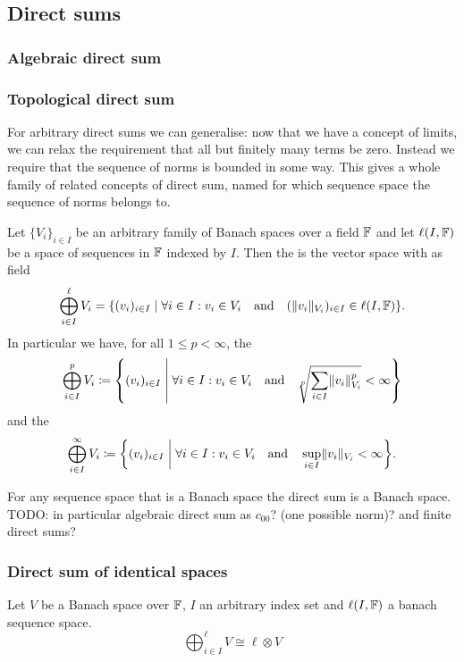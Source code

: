 \subsection{Direct sums}
\subsubsection{Algebraic direct sum}

\subsubsection{Topological direct sum}
For arbitrary direct sums we can generalise: now that we have a concept of limits, we can relax the requirement that all but finitely many terms be zero. Instead we require that the sequence of norms is bounded in some way. This gives a whole family of related concepts of direct sum, named for which sequence space the sequence of norms belongs to.
\begin{definition}
Let $\{V_i\}_{i\in I}$ be an arbitrary family of Banach spaces over a field $\mathbb{F}$ and let $\ell(I,\mathbb{F})$ be a space of sequences in $\mathbb{F}$ indexed by $I$. Then the  is the vector space with as field
\[ \bigoplus_{i\in I}^\ell V_i = \setbuilder{(v_i)_{i\in I}}{\forall i\in I: v_i\in V_i \quad\text{and}\quad (\norm{v_i}_{V_i})_{i\in I}\in \ell(I,\F) }. \]
In particular we have, for all $1\leq p<\infty$, the 
\[ \bigoplus_{i\in I}^p V_i \defeq \setbuilder{(v_i)_{i\in I}}{\forall i\in I: v_i\in V_i \quad\text{and}\quad \sqrt[p]{\sum_{i\in I}\norm{v_i}_{V_i}^p}<\infty} \]
and the 
\[ \bigoplus_{i\in I}^\infty V_i \defeq \setbuilder{(v_i)_{i\in I}}{\forall i\in I: v_i\in V_i \quad\text{and}\quad \sup_{i\in I}\norm{v_i}_{V_i}<\infty}. \]
\end{definition}

\begin{proposition}
For any sequence space that is a Banach space the direct sum is a Banach space. TODO: in particular algebraic direct sum as $c_{00}$? (one possible norm)? and finite direct sums?
\end{proposition}

\subsubsection{Direct sum of identical spaces}
\begin{proposition}
Let $V$ be a Banach space over $\mathbb{F}$, $I$ an arbitrary index set and $\ell(I,\mathbb{F})$ a banach sequence space.
\[ \bigoplus_{i\in I}^\ell V \cong \ell\otimes V \]
\end{proposition}

